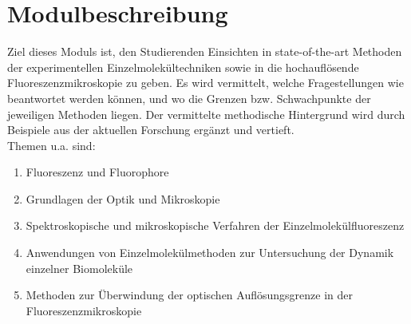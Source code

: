 \section{Modulbeschreibung}
Ziel dieses Moduls ist, den Studierenden Einsichten in state-of-the-art Methoden der experimentellen Einzelmolekültechniken sowie in die hochauflösende Fluoreszenzmikroskopie zu geben. Es wird vermittelt, welche Fragestellungen wie beantwortet werden können, und wo die Grenzen bzw. Schwachpunkte der jeweiligen Methoden liegen. Der vermittelte methodische Hintergrund wird durch Beispiele aus der aktuellen Forschung ergänzt und vertieft.\\
Themen u.a. sind:
\begin{enumerate}
\item Fluoreszenz und Fluorophore
\item Grundlagen der Optik und Mikroskopie
\item Spektroskopische und mikroskopische Verfahren der Einzelmolekülfluoreszenz
\item Anwendungen von Einzelmolekülmethoden zur Untersuchung der Dynamik einzelner Biomoleküle
\item Methoden zur Überwindung der optischen Auflösungsgrenze in der Fluoreszenzmikroskopie
\end{enumerate}	

    